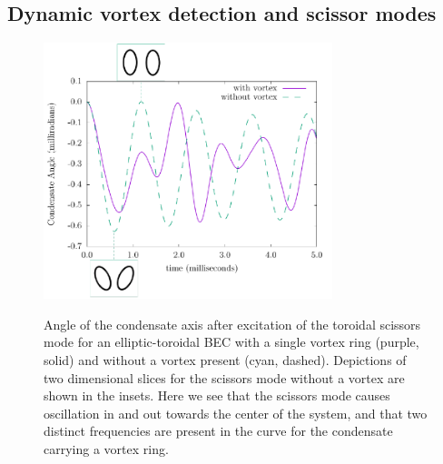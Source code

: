 \subsection{Dynamic vortex detection and scissor modes}

\begin{figure}
\center \includegraphics[width=0.75\textwidth]{data/3d/scissors_plot.pdf}
\label{fig:scissors}
\caption{\label{fig:scissors} Angle of the condensate axis after excitation of the toroidal scissors mode for an elliptic-toroidal BEC with a single vortex ring (purple, solid) and without a vortex present (cyan, dashed).
Depictions of two dimensional slices for the scissors mode without a vortex are shown in the insets.
Here we see that the scissors mode causes oscillation in and out towards the center of the system, and that two distinct frequencies are present in the curve for the condensate carrying a vortex ring. }
\end{figure}

